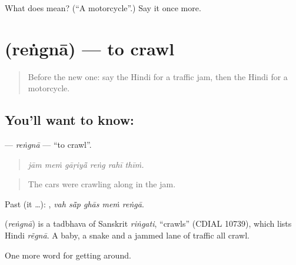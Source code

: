 \begin{tcolorbox}[breakable,colback=teal!4,colframe=teal!35!black,title={Before you move on}]
What does  mean? (\textquotedblleft{}A motorcycle\textquotedblright{}.) Say it once more.
\end{tcolorbox}
\section[\texorpdfstring{\hi{रेंगना} (reṅgnā)}{रेंगना (reṅgnā)}]{ (reṅgnā) — to crawl}

\label{lesson:HI-C404-rengna}



\begin{quote}
Before the new one: say the Hindi for a traffic jam, then the Hindi for a motorcycle.
\end{quote}

\subsection*{You'll want to know: }
\textbf{} — \emph{reṅgnā} — \textquotedblleft{}to crawl\textquotedblright{}.

\begin{quote}
     
\end{quote}

\begin{quote}
\emph{jām meṁ gāṛiyā̃ reṅg rahī thīṁ.}
\end{quote}

\begin{quote}
The cars were crawling along in the jam.
\end{quote}

Past (it …):     , \emph{vah sā̃p ghās meṁ reṅgā}.

\begin{cousinweb}
\textbf{} (\emph{reṅgnā}) is a tadbhava of Sanskrit \emph{riṅgati}, \textquotedblleft{}crawls\textquotedblright{} (CDIAL 10739), which lists Hindi \emph{rẽgnā}. A baby, a snake and a jammed lane of traffic all crawl.
\end{cousinweb}

\begin{grammarlens}[title={What you've built}]
One more word for getting around.
\end{grammarlens}

